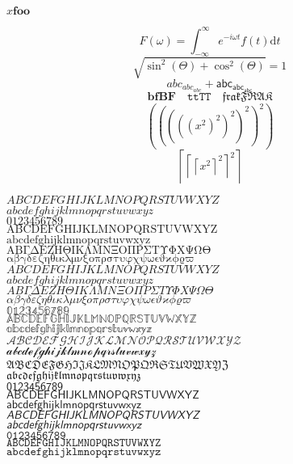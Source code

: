 \documentclass[10pt]{article}
\begin{document}
$x \mathbf{foo}$

\[
  F(\omega) = \int_{-\infty}^{\infty} e^{-i\omega t} f(t) \mathrm{d} t
\]
\[
  \sqrt{\sin^2(\Theta) + \cos^2(\Theta)} = 1
\]
\[
 abc_{abc_{abc}}+\mathsf{abc_{abc_{abc}}}
\]
\[
 \mathbf{bfBF}\quad\mathtt{ttTT}\quad\mathfrak{frakFRAK}
\]
\[
  \left(\left(\left(\left(\left(x^2\right)^2\right)^2\right)^2\right)^2\right)
\]
\[
  \left\lceil \left\lceil \left\lceil x^2 \right\rceil^2 \right\rceil^2 \right\rceil
\]

\newpage
\setlength\parindent{0pt}

$ABCDEFGHIJKLMNOPQRSTUVWXYZ$ \\
$abcdefghijklmnopqrstuvwxyz$ \\
$0123456789$ \\
$\mathrm{ABCDEFGHIJKLMNOPQRSTUVWXYZ}$ \\
$\mathrm{abcdefghijklmnopqrstuvwxyz}$ \\
$\mathrm{ΑΒΓΔΕΖΗΘΙΚΛΜΝΞΟΠΡΣΤΥΦΧΨΩ}$\quad$\mathrm{ϴ}$ \\
$\mathrm{αβγδεζηθικλμνξοπρστυφχψω}$\quad$\mathrm{ϵϑϰϕϱϖ}$ \\
$\mathit{ABCDEFGHIJKLMNOPQRSTUVWXYZ}$ \\
$\mathit{abcdefghijklmnopqrstuvwxyz}$ \\
$\mathit{ΑΒΓΔΕΖΗΘΙΚΛΜΝΞΟΠΡΣΤΥΦΧΨΩ}$\quad$\mathit{ϴ}$ \\
$\mathit{αβγδεζηθικλμνξοπρστυφχψω}$\quad$\mathit{ϵϑϰϕϱϖ}$ \\
$\mathbb{0123456789}$ \\
$\mathbb{ABCDEFGHIJKLMNOPQRSTUVWXYZ}$ \\
$\mathbb{abcdefghijklmnopqrstuvwxyz}$ \\
$\mathscr{ABCDEFGHIJKLMNOPQRSTUVWXYZ}$ \\
$\mathscr{abcdefghijklmnopqrstuvwxyz}$ \\
$\mathfrak{ABCDEFGHIJKLMNOPQRSTUVWXYZ}$ \\
$\mathfrak{abcdefghijklmnopqrstuvwxyz}$ \\
$\mathsf{0123456789}$ \\
$\mathsf{ABCDEFGHIJKLMNOPQRSTUVWXYZ}$ \\
$\mathsf{abcdefghijklmnopqrstuvwxyz}$ \\
$\mathsfit{ABCDEFGHIJKLMNOPQRSTUVWXYZ}$ \\
$\mathsfit{abcdefghijklmnopqrstuvwxyz}$ \\
$\mathtt{0123456789}$ \\
$\mathtt{ABCDEFGHIJKLMNOPQRSTUVWXYZ}$ \\
$\mathtt{abcdefghijklmnopqrstuvwxyz}$ \\
\end{document}
